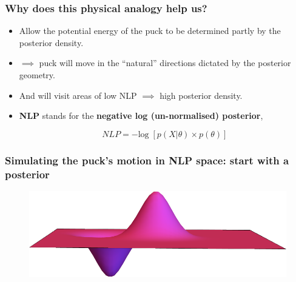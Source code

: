 \documentclass[handout]{beamer}
\begin{document}
\begin{frame}
	\frametitle{Why does this physical analogy help us?}
	
	\begin{itemize}
		\item<2-> Allow the potential energy of the puck to be determined partly by the posterior density.
		\item<3-> $\implies$ puck will move in the ``natural'' directions dictated by the posterior geometry.
		\item<4-> And will visit areas of low NLP $\implies$ high posterior density.
		\item<5-> \textbf{NLP} stands for the \textbf{negative log (un-normalised) posterior},
		
		\begin{equation}
		NLP = - \text{log}\; \left[p(X|\theta) \times p(\theta) \right]
		\end{equation}
		
	\end{itemize}
	
\end{frame}

\begin{frame}
	\frametitle{Simulating the puck's motion in NLP space: start with a posterior}
	
	\begin{figure}[ht]
		\centerline{\includegraphics[width=1\textwidth]{animations_figures/lec5_nlpPosteriorOnly.png}}
	\end{figure}
	
\end{frame}
\end{document}
